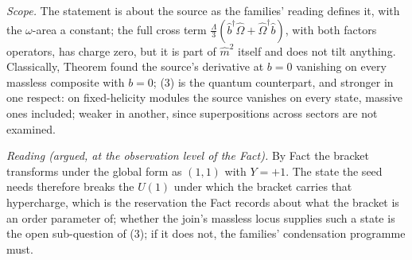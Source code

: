\emph{Scope.} The statement is about the source as the families' reading defines it, with the $\omega$-area a constant; the full cross term $\tfrac{\Lambda}{3}(\hat{b}^{\dagger}\hat{\Omega} + \hat{\Omega}^{\dagger}\hat{b})$, with both factors operators, has charge zero, but it is part of $\hat{m}^{2}$ itself and does not tilt anything. Classically, Theorem  found the source's derivative at $b = 0$ vanishing on every massless composite with $b = 0$; (3) is the quantum counterpart, and stronger in one respect: on fixed-helicity modules the source vanishes on every state, massive ones included; weaker in another, since superpositions across sectors are not examined.

\emph{Reading (argued, at the observation level of the Fact).} By Fact  the bracket transforms under the global form as $(1,1)$ with $Y = +1$. The state the seed needs therefore breaks the $U(1)$ under which the bracket carries that hypercharge, which is the reservation the Fact records about what the bracket is an order parameter of; whether the join's massless locus supplies such a state is the open sub-question of (3); if it does not, the families' condensation programme must.
